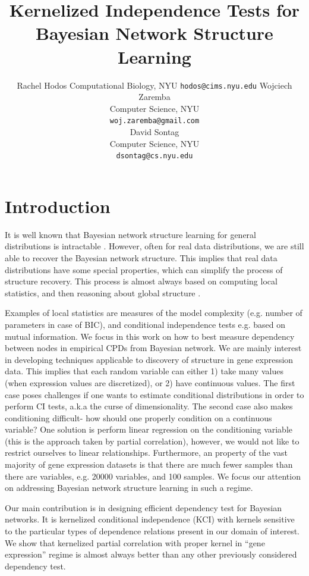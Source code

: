 \documentclass{article} %
\title{Kernelized Independence Tests for Bayesian Network Structure Learning}
\author{
Rachel Hodos
Computational Biology, NYU
\texttt{hodos@cims.nyu.edu}
\Xnd
Wojciech Zaremba \\
Computer Science, NYU \\
\texttt{woj.zaremba@gmail.com} \\
\XND
David Sontag \\
Computer Science, NYU \\
\texttt{dsontag@cs.nyu.edu} \\
}
\begin{document}
\maketitle

\begin{abstract}

\end{abstract}


\section{Introduction}
It is well known that Bayesian network structure learning for general distributions is 
intractable \cite{chickering1996learning}. However, often
for real data distributions, we are still able to 
recover the Bayesian network structure. This implies that real data
distributions have some special properties, which can simplify the process
of structure recovery.  This  process is almost always
based on computing local statistics, and then 
reasoning about global structure \cite{jaakkola2010learning, tsamardinos2006max}. 


Examples of local statistics are measures of the model complexity (e.g. number of parameters in case of BIC\cite{schwarz1978estimating}), and conditional independence tests e.g. based on mutual information.  We focus in this work on how to best measure dependency between nodes
in empirical CPDs from Bayesian network. We are mainly interest
in developing techniques applicable to discovery of structure
in gene expression data. This implies that each random variable
can either 1) take many values (when expression values are discretized), or 2) have continuous
values. The first case poses challenges if one wants to estimate conditional distributions in order to perform CI tests, a.k.a the curse of dimensionality.  The second case also makes conditioning difficult- how should one properly condition on a continuous variable?  One solution is perform linear regression on the conditioning variable (this is the approach taken by partial correlation), however, we would not like to restrict ourselves to linear relationships.  Furthermore, an property of the vast majority of gene expression datasets is that there are much fewer samples than there are variables, e.g. 20000 variables, and 100 samples.   We focus our attention on addressing Bayesian network structure learning
in such a regime. 


Our main contribution is in designing efficient dependency test
for Bayesian networks. It is kernelized conditional independence (KCI) with
kernels sensitive to the particular types of dependence relations present in our domain of interest. We show
that kernelized partial correlation with proper kernel in ``gene expression''
regime is almost always better than any other previously considered
dependency test. 
\end{document}
